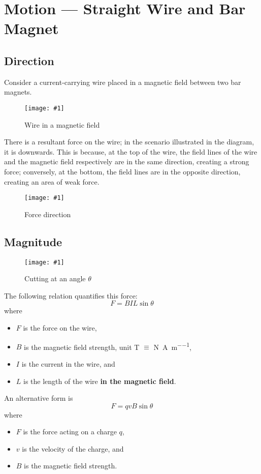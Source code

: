 \documentclass[a4paper,12pt]{article}
\let\oldsection\section
\renewcommand\section{\clearpage\oldsection}
\let\oldsi\si
\renewcommand{\si}[1]{\oldsi[per-mode=reciprocal-positive-first]{#1}}
\newcommand{\img}[4]{\begin{center}
  \begin{figure}[H]
    \centering
    \texttt{[image: \#1]}
    \caption{#3}
    \label{fig:#4}
  \end{figure}
\end{center}}
\begin{document}
\section{Motion --- Straight Wire and Bar Magnet}

\subsection{Direction}

Consider a current-carrying wire placed in a magnetic field between two bar magnets.

\img{wireinmagneticfield.jpg}{0.6}{Wire in a magnetic field}{wireinmagneticfield}

There is a resultant force on the wire; in the scenario illustrated in the diagram, it is downwards. This is because, at the top of the wire, the field lines of the wire and the magnetic field respectively are in the same direction, creating a strong force; conversely, at the bottom, the field lines are in the opposite direction, creating an area of weak force.

\img{wireinmagneticfield_1.png}{0.6}{Force direction}{force}

\subsection{Magnitude}

\img{wireinmagneticfield_angle.png}{0.35}{Cutting at an angle $\theta$}{force}

The following relation quantifies this force:
\begin{equation}\label{eq:BIL}
  F = BIL\sin\theta
\end{equation}
where
\begin{itemize}
  \item $F$ is the force on the wire,
  \item $B$ is the magnetic field strength, unit \si{\tesla} $\equiv$ \si{\newton\per\ampere\per\metre},
  \item $I$ is the current in the wire, and
  \item $L$ is the length of the wire \textbf{in the magnetic field}.
\end{itemize}
An alternative form is
\begin{equation}\label{eq:BIL2}
  F = qvB\sin\theta
\end{equation}
where
\begin{itemize}
  \item $F$ is the force acting on a charge $q$,
  \item $v$ is the velocity of the charge, and
  \item $B$ is the magnetic field strength.
\end{itemize}
\end{document}
